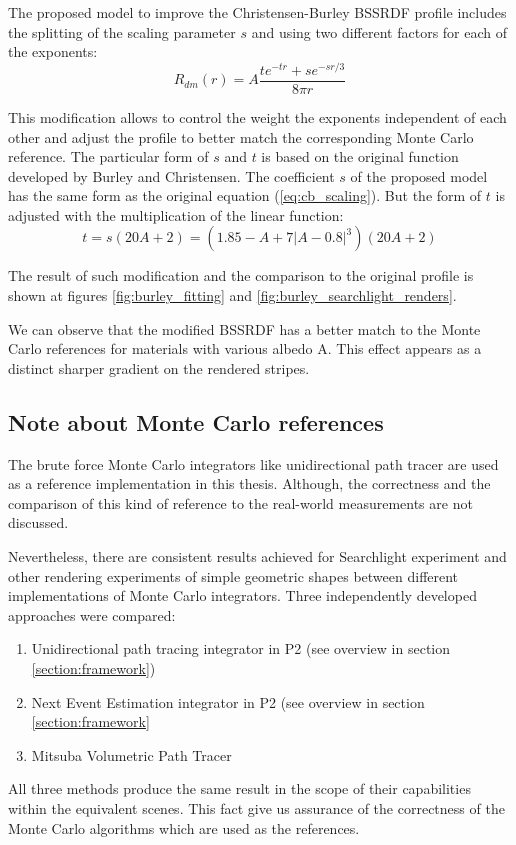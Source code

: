The proposed model to improve the Christensen-Burley BSSRDF profile includes the splitting of the
scaling parameter $s$ and using two different factors for each of the exponents:
\begin{equation}
\label{eq:burley_modified}
R_{dm}(r) = A\dfrac{te^{-tr}+se^{-sr/3}}{8\pi r}
\end{equation}

This modification allows to control the weight the exponents independent of each other and adjust
the profile to better match the corresponding Monte Carlo reference. The particular form of $s$ and
$t$ is based on the original function developed by Burley and Christensen. The coefficient $s$ of
the proposed model has the same form as the original equation (\ref{eq:cb_scaling}). But the form of
$t$ is adjusted with the multiplication of the linear function:
\begin{equation}
\label{eq:cb_scaling_modified}
t=s(20A+2)=(1.85-A + 7|A - 0.8|^3)(20A+2)
\end{equation}

The result of such modification and the comparison to the original profile is shown at figures
\ref{fig:burley_fitting} and \ref{fig:burley_searchlight_renders}.

We can observe that the modified BSSRDF has a better match to the Monte Carlo references for
materials with various albedo A. This effect appears as a distinct sharper gradient on the rendered
stripes.

\subsection{Note about Monte Carlo references}
The brute force Monte Carlo integrators like unidirectional path tracer are used as a reference
implementation in this thesis. Although, the correctness and the comparison of this kind of
reference to the real-world measurements are not discussed.

Nevertheless, there are consistent results achieved for Searchlight experiment and other rendering
experiments of simple geometric shapes between different implementations of Monte Carlo integrators.
Three independently developed approaches were compared:
\begin{enumerate}
  \item Unidirectional path tracing integrator in P2 (see overview in section
  \ref{section:framework})
  \item Next Event Estimation integrator in P2 (see overview in section \ref{section:framework}
  \item Mitsuba Volumetric Path Tracer \cite{Mitsuba}
\end{enumerate}

All three methods produce the same result in the scope of their capabilities within the equivalent
scenes. This fact give us assurance of the correctness of the Monte Carlo algorithms which are
used as the references.
